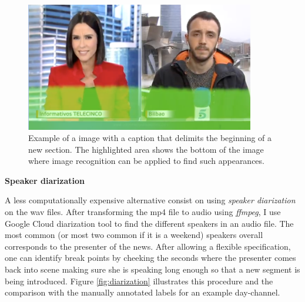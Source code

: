 \documentclass[12pt]{article}
\begin{document}
	\begin{figure}[H]	\label{figure:image_rec}
		\centering
		\includegraphics[width=100mm]{figures/image_recog}
		
		\caption{Example of a image with a caption that delimits the beginning of a new section. The highlighted area shows the bottom of the image where image recognition can be applied to find such appearances.}
		
	\end{figure} 
	
	
	
	
	\textbf{Speaker diarization}
	
	
	A less computationally expensive alternative consist on using \textit{speaker diarization} on the wav files. After transforming the mp4 file to audio using \textit{ffmpeg}, I use Google Cloud diarization tool to find the different speakers in an audio file. The most common (or most two common if it is a weekend) speakers overall corresponds to the presenter of the news. After allowing a flexible specification, one can identify break points by cheeking the seconds where the presenter comes back into scene making sure she is speaking long enough so that a new segment is being introduced. Figure \ref{fig:diarization} illustrates this procedure and the comparison with the manually annotated labels for an example day-channel.
	
\end{document}
